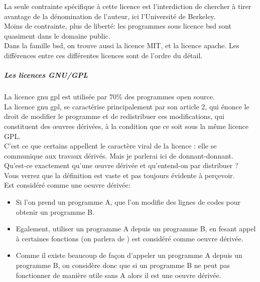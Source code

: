 				La seule contrainte spécifique à cette licence est l'interdiction de chercher à tirer avantage de la dénomination de l'auteur, ici l'Université de Berkeley.\\

				Moins de contrainte, plus de liberté: les programmes sous licence \acrshort{bsd} sont quasiment dans le domaine public.\\

				Dans la famille \acrshort{bsd}, on trouve aussi la licence MIT, et la licence \Gls{apache}. Les différences entre ces différentes licences sont de l'ordre du détail.

				\subparagraph{Les licences GNU/GPL\\}

				La licence \acrfull{gnu gpl} est utilisée par 70\% des programmes open source.\\ 
				
				La licence \acrshort{gnu gpl}, se caractérise principalement par son article 2, qui énonce le droit de modifier le programme et de redistribuer ces modifications, qui constituent des œuvres dérivées, à la condition que ce soit sous la même licence GPL. \\
				
				C'est ce que certains appellent le caractère viral de la licence : elle se communique aux travaux dérivés. Mais je parlerai ici de donnant-donnant. \\
				
				Qu'est-ce exactement qu'une œuvre dérivée et qu'entend-on par distribuer ?\\

				Vous verrez que la définition est vaste et pas toujours évidente à perçevoir.\\

				Est considéré comme une oeuvre dérivée:

				\begin{itemize}[label=\textbullet, font=\LARGE \color{burntorange}]
					\item Si l'on prend un programme A, que l'on modifie des lignes de codes pour obtenir un programme B.

					\item Egalement, utiliser un programme A depuis un programme B, en fesant appel à certaines fonctions (on parlera de ) est considéré comme oeuvre dérivée.

					\item Comme il existe beaucoup de façon d'appeler un programme A depuis un programme B, on considère donc que si un programme B ne peut pas fonctionner de manière utile sans A alors il est une oeuvre dérivée.
				\end{itemize} 


